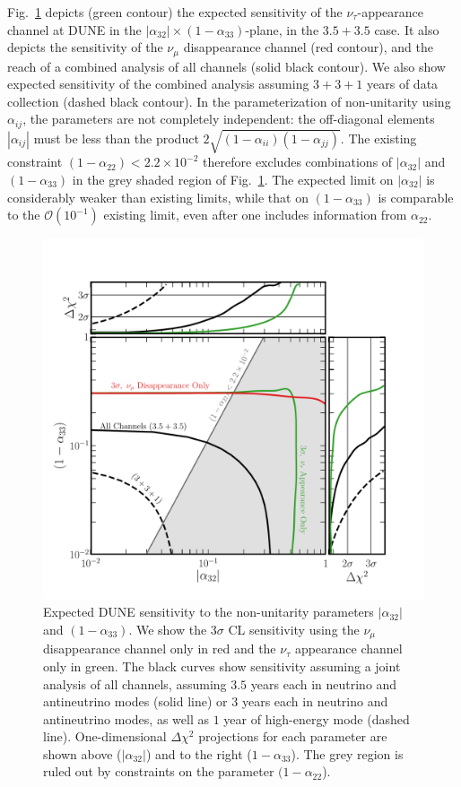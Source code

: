\documentclass[aps,prd,onecolumn,nofootinbib,superscriptaddress, 11pt]{revtex4}
\begin{document}
Fig.~\ref{fig:NonUnitary} depicts (green contour) the expected sensitivity of the $\nu_{\tau}$-appearance channel at DUNE in the $|\alpha_{32}| \times(1-\alpha_{33})$-plane, in the $3.5+3.5$ case. It also depicts the sensitivity of the $\nu_{\mu}$ disappearance channel (red contour), and the reach of a combined analysis of all channels (solid black contour). We also show expected sensitivity of the combined analysis assuming $3+3+1$ years of data collection (dashed black contour). In the parameterization of non-unitarity using $\alpha_{ij}$, the parameters are not completely independent: the off-diagonal elements $|\alpha_{ij}|$ must be less than the product $2\sqrt{(1-\alpha_{ii})(1-\alpha_{jj})}$. The existing constraint $(1-\alpha_{22}) < 2.2 \times 10^{-2}$ therefore excludes combinations of $|\alpha_{32}|$ and $(1-\alpha_{33})$ in the grey shaded region of Fig.~\ref{fig:NonUnitary}. The expected limit on $|\alpha_{32}|$ is considerably weaker than existing limits, while that on $(1-\alpha_{33})$ is comparable to the $\mathcal{O}(10^{-1})$ existing limit, even after one includes information from $\alpha_{22}$. 
\begin{figure}[ht]
\centering
\includegraphics[width=0.65\linewidth]{a32_a33.pdf}
\caption{Expected DUNE sensitivity to the non-unitarity parameters $|\alpha_{32}|$ and $(1-\alpha_{33})$. We show the $3\sigma$ CL sensitivity using the $\nu_\mu$ disappearance channel only in red and the $\nu_\tau$ appearance channel only in green. The black curves show sensitivity assuming a joint analysis of all channels, assuming $3.5$ years each in neutrino and antineutrino modes (solid line) or $3$ years each in neutrino and antineutrino modes, as well as $1$ year of high-energy mode (dashed line). One-dimensional $\Delta \chi^2$ projections for each parameter are shown above ($|\alpha_{32}|$) and to the right ($1 - \alpha_{33}$). The grey region is ruled out by constraints on the parameter $(1 - \alpha_{22}$).}
\label{fig:NonUnitary}
\end{figure}
\end{document}
